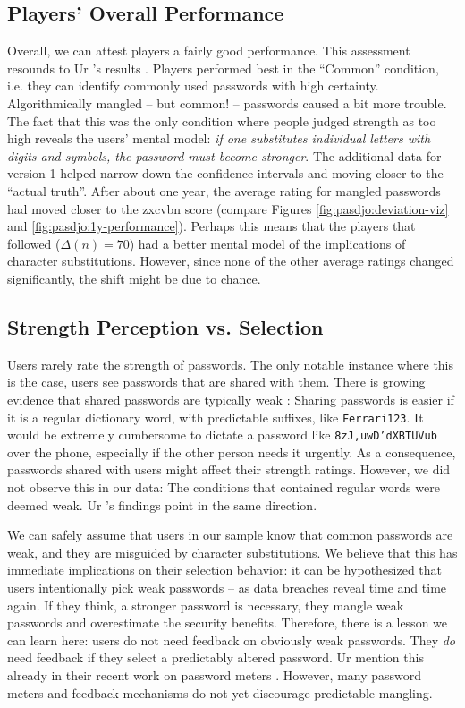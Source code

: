 \subsection{Players' Overall Performance}
Overall, we can attest players a fairly good performance. This assessment resounds to Ur \etal's results \cite{Ur2016PerceptionsPassword}. Players performed best in the ``Common'' condition, i.e. they can identify commonly used passwords with high certainty. Algorithmically mangled -- but common! -- passwords caused a bit more trouble. The fact that this was the only condition where people judged strength as too high reveals the users' mental model: \textit{if one substitutes individual letters with digits and symbols, the password must become stronger}. The additional data for version 1 helped narrow down the confidence intervals and moving closer to the ``actual truth''. After about one year, the average rating for mangled passwords had moved closer to the zxcvbn score (compare Figures \ref{fig:pasdjo:deviation-viz} and \ref{fig:pasdjo:1y-performance}). Perhaps this means that the players that followed ($\Delta(n)=70$) had a better mental model of the implications of character substitutions. However, since none of the other average ratings changed significantly, the shift might be due to chance. 

\subsection{Strength Perception vs. Selection}
Users rarely rate the strength of passwords. The only notable instance where this is the case, users see passwords that are shared with them. There is growing evidence that shared passwords are typically weak \cite{Haque2014Hierarchy,  Shay2010EncounteringPasswordRequirements, Singh2007PasswordSharing, Violettas2014PasswordsAvoidGreece, Weirich2001PrettyGoodPersuasion, ZhangKennedy2016RevisitingPasswordRules}: Sharing passwords is easier if it is a regular dictionary word, with predictable suffixes, like \texttt{Ferrari123}. It would be extremely cumbersome to dictate a password like \texttt{8zJ,uwD'dXBTUVub} over the phone, especially if the other person needs it urgently. As a consequence, passwords shared with users might affect their strength ratings. However, we did not observe this in our data: The conditions that contained regular words were deemed weak. Ur \etal's findings point in the same direction. 

We can safely assume that users in our sample know that common passwords are weak, and they are misguided by character substitutions. We believe that this has immediate implications on their selection behavior: it can be hypothesized that users intentionally pick weak passwords -- as data breaches reveal time and time again. If they think, a stronger password is necessary, they mangle weak passwords and overestimate the security benefits. Therefore, there is a lesson we can learn here: users do not need feedback on obviously weak passwords. They \textit{do} need feedback if they select a predictably altered password. Ur \etal mention this already in their recent work on password meters \cite{Ur2017DataDrivenPWMeter}. However, many password meters and feedback mechanisms do not yet discourage predictable mangling. 

